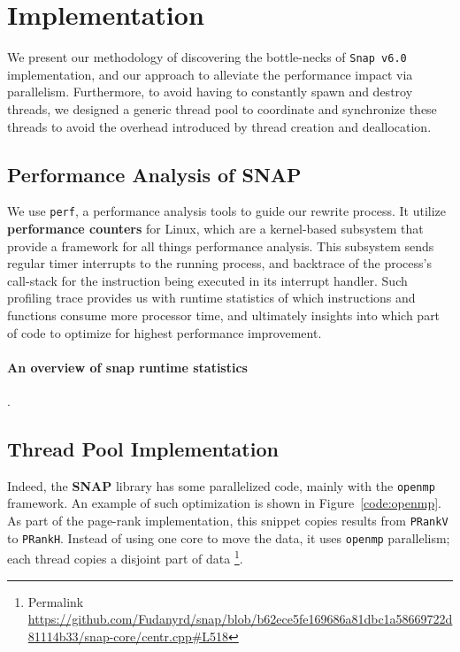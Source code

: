 \section{Implementation} \label{sec:impl}

\par We present our methodology of discovering the bottle-necks of 
\texttt{Snap v6.0} implementation, and our approach to alleviate the performance
impact via parallelism. Furthermore, to avoid having to constantly spawn and
destroy threads, we designed a generic thread pool to coordinate and 
synchronize these threads to avoid the overhead introduced by thread creation
and deallocation.


\subsection{Performance Analysis of \textbf{SNAP}}


\par We use \texttt{perf}\citep{linux-perf}, a performance analysis tools to 
guide our rewrite process. It utilize \textbf{performance counters} for Linux,
which are a kernel-based subsystem that provide a framework for all things 
performance analysis. This subsystem sends regular timer interrupts to the
running process, and backtrace of the process's call-stack for the instruction
being executed in its interrupt handler. Such profiling trace provides us with 
runtime statistics of which instructions and functions consume more processor 
time, and ultimately insights
into which part of code to optimize for highest performance improvement.

\paragraph{An overview of snap runtime statistics}. 

\subsection{Thread Pool Implementation}

\par Indeed, the \textbf{SNAP} library has some parallelized code, mainly 
with the \texttt{openmp} framework\citep{openmp,embedded-hps}. An example
of such optimization is shown in Figure~\ref{code:openmp}. As part of the page-rank
implementation, this snippet copies results from \texttt{PRankV} to \texttt{PRankH}.
Instead of using one core to move the data, it uses \texttt{openmp} parallelism; 
each  thread copies a disjoint part of data
\footnote{Permalink 
\url{https://github.com/Fudanyrd/snap/blob/b62ece5fe169686a81dbc1a58669722d81114b33/snap-core/centr.cpp\#L518}}.

